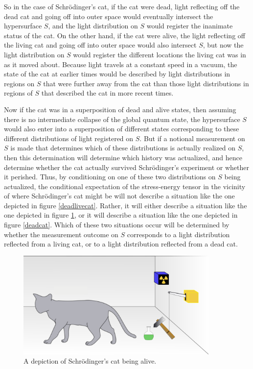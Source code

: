 So in the case of Schr\"{o}dinger's cat, if the cat were dead,  light reflecting off the dead cat and going off into outer space would eventually intersect the hypersurface $S$, and the light distribution on $S$ would register the inanimate status of the cat. On the other hand, if the cat were alive, the light reflecting off the living cat and going off into outer space would also intersect $S$, but now the light distribution on $S$ would register the different locations the living cat was in as it moved about. Because light travels at a constant speed in a vacuum, the state of the cat at earlier times would be described by light distributions in regions on $S$ that were further away from the cat than those light distributions in regions of $S$ that described the cat in more recent times. 

Now if the cat was in a superposition of dead and alive states, then assuming there is no intermediate collapse of the global quantum state,  the hypersurface $S$ would also enter into a superposition of different states corresponding to these different distributions of light registered on $S$. But if a notional measurement on $S$ is made that determines which of these distributions is actually realized on $S$, then this determination will determine which history was actualized, and hence determine whether the cat actually survived Schr\"{o}dinger's experiment or whether it perished.   Thus, by conditioning on one of these two distributions on $S$ being actualized, the conditional expectation of the stress-energy tensor in the vicinity of where Schr\"{o}dinger's cat might be 
will not describe a situation like the one depicted in figure \ref{deadlivecat}.   Rather, it will either describe a situation like the one depicted in figure \ref{livecat}, or it will describe a situation like the one depicted in figure \ref{deadcat}. Which of these two situations occur will be determined by whether the measurement outcome on $S$ corresponds to a light distribution reflected from a living cat, or to a light distribution reflected from a dead cat. 
\begin{figure}[ht!]
  \captionsetup{justification=justified}
  \centering
  \includegraphics[width=100mm]{Chapter03/Schrodingers_livecat.png}
  \caption[Caption for LOF]{A depiction of Schr\"{o}dinger's cat being alive.\protect\footnotemark}
  \label{livecat}
  \end{figure}


